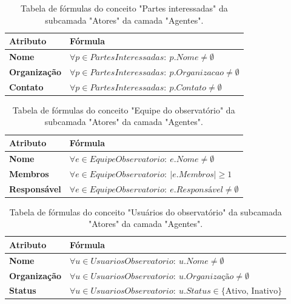 \begin{apendicesenv}
\begin{table}[H]
\centering
\caption{Tabela de fórmulas do conceito "Partes interessadas" da subcamada "Atores" da camada "Agentes".}
\begin{tabularx}{\textwidth}{|l|X|}
\hline
\textbf{Atributo} & \textbf{Fórmula} \\ \hline
\textbf{Nome} & $\forall p \in PartesInteressadas:\ p.Nome \neq \emptyset$ \\ \hline
\textbf{Organização} & $\forall p \in PartesInteressadas:\ p.Organizacao \neq \emptyset$ \\ \hline
\textbf{Contato} & $\forall p \in PartesInteressadas:\ p.Contato \neq \emptyset$ \\ \hline
\end{tabularx}
\end{table}

\begin{table}[H]
\centering
\caption{Tabela de fórmulas do conceito "Equipe do observatório" da subcamada "Atores" da camada "Agentes".}
\begin{tabularx}{\textwidth}{|l|X|}
\hline
\textbf{Atributo} & \textbf{Fórmula} \\ \hline
\textbf{Nome} & $\forall e \in EquipeObservatorio:\ e.Nome \neq \emptyset$ \\ \hline
\textbf{Membros} & $\forall e \in EquipeObservatorio:\ |e.Membros| \ge 1$ \\ \hline
\textbf{Responsável} & $\forall e \in EquipeObservatorio:\ e.Responsável \neq \emptyset$ \\ \hline
\end{tabularx}
\end{table}

\begin{table}[H]
\centering
\caption{Tabela de fórmulas do conceito "Usuários do observatório" da subcamada "Atores" da camada "Agentes".}
\begin{tabularx}{\textwidth}{|l|X|}
\hline
\textbf{Atributo} & \textbf{Fórmula} \\ \hline
\textbf{Nome} & $\forall u \in UsuariosObservatorio:\ u.Nome \neq \emptyset$ \\ \hline
\textbf{Organização} & $\forall u \in UsuariosObservatorio:\ u.Organização \neq \emptyset$ \\ \hline
\textbf{Status} & $\forall u \in UsuariosObservatorio:\ u.Status \in \{\text{Ativo, Inativo}\}$ \\ \hline
\end{tabularx}
\end{table}


\end{apendicesenv}
